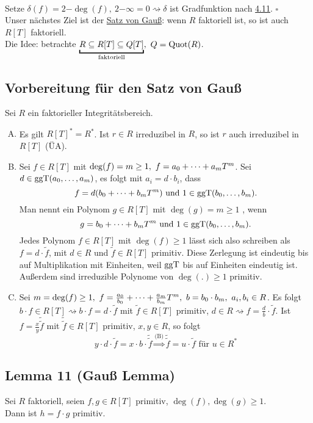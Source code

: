 \\
Setze $\delta(f)=2{-\deg(f)},~2{-\infty}=0 \rightsquigarrow \delta$ ist Gradfunktion nach \hyperref[sub:polynomdivision]{4.11}.
\hfill $\square$\\

Unser nächstes Ziel ist der \uline{Satz von Gauß}:
wenn $R$ faktoriell ist, so ist auch $R[T]$ faktoriell.\\
Die Idee:
betrachte $\underbracket{R\subseteq R[T]\subseteq Q[T]}_{\text{faktoriell}},~Q=\Quot(R)$.

\subsection{Vorbereitung für den Satz von Gauß}
\label{sub:vorbereitung_satz_von_gauss}
Sei $R$ ein faktorieller Integritätsbereich.
\begin{enumerate}[(A)]
	\item Es gilt $R[T]^*=R^*$.
	Ist $r\in R$ irreduzibel in $R$, so ist $r$ auch irreduzibel in $R[T]$ (ÜA).
	\item Sei $f\in R[T]$ mit $\deg(f)=m\ge 1,~f=a_0+ \dots +a_mT^m$.
	Sei $d\in\operatorname{ggT}(a_0, \dots ,a_m)$, es folgt mit $a_i=d\cdot b_i$, dass
	\[
	f=d(b_0+ \dots +b_mT^m) \text{ und } 1\in \operatorname{ggT}(b_0, \dots ,b_m).
	\]
	Man nennt ein Polynom $g\in R[T]$ mit $\deg(g)=m\ge 1$ , wenn 
	\[
	g=b_0+ \dots +b_mT^m \text{ und } 1\in \operatorname{ggT}(b_0, \dots ,b_m).
	\]
	Jedes Polynom $f\in R[T]$ mit $\deg(f)\ge 1$ lässt sich also schreiben als $f=d\cdot \tilde{f}$, mit $d\in R$ und $\tilde{f}\in R[T]$ primitiv.
	Diese Zerlegung ist eindeutig bis auf Multiplikation mit Einheiten, weil $\operatorname{ggT}$ bis auf Einheiten eindeutig ist.
	Außerdem sind irreduzible Polynome von $\deg(.)\ge 1$ primitiv.
	\item Sei $m=\deg(f)\ge 1,~f=\frac{a_0}{b_0}+ \dots + \frac{a_m}{b_m}T^m,~b=b_0\cdot b_m,~a_i,b_i\in R$.
	Es folgt $b\cdot f\in R[T]\rightsquigarrow b\cdot f =d\cdot \tilde{f}$ mit $\tilde{f}\in R[T]$ primitiv, $d\in R\rightsquigarrow f=\frac{d}{b}\cdot \tilde{f}$.
	Ist $f=\frac{x}{y}\tilde{\tilde{f}}$ mit $\tilde{\tilde{f}}\in R[T]$ primitiv, $x,y\in R$, so folgt
	\[
	y\cdot d\cdot \tilde{f}=x\cdot b\cdot \tilde{\tilde{f}}\stackrel{\text{(B)}}{\Rightarrow} \tilde{\tilde{f}}=u\cdot \tilde{f} \text{ für } u\in R^*
	\]
\end{enumerate}

\subsection{Lemma 11 (Gauß Lemma)}
\label{sub:gauss_lemma}
Sei $R$ faktoriell, seien $f,g\in R[T]$ primitiv, $\deg(f),\deg(g)\ge 1$.\\
Dann ist $h=f\cdot g$ primitiv.\\

